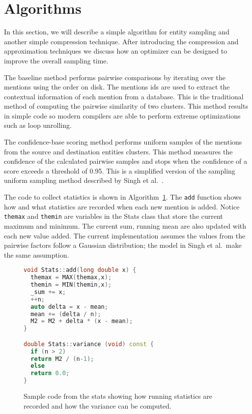 

\section{Algorithms}

In this section, we will describe a simple algorithm for entity sampling and
another simple compression technique.
After introducing the compression and approximation techniques we discuss how
an optimizer can be designed to improve the overall sampling time.

The baseline method performs pairwise comparisons by 
iterating over the mentions using the order on disk.
The mentions ids are used to extract the contextual information of each mention from a database.
This is the traditional method of computing the pairwise similarity of two clusters. 
This method results in simple code so modern compilers are able to perform extreme
optimizations such as loop unrolling.

The confidence-base scoring method performs uniform samples of the
mentions from the source and destination entities clusters. This method
measures the confidence of the calculated pairwise samples and stops when the
confidence of a score exceeds a threshold of 0.95.
This is a simplified version of the sampling uniform sampling method described by Singh et al.~\cite{singh2012monte}.

The code to collect statistics is shown in Algorithm~\ref{algo:stats}.
The \texttt{add} function shows how and what statistics are recorded when each new mention is added.
Notice \texttt{themax} and \texttt{themin} are variables in the Stats class that
store the current maximum and minimum.
The current sum, running mean are also updated with each new value added.
The current implementation assumes the values from the pairwise factors follow a Gaussian distribution;
the model in Singh et al.\ make the same assumption.

\begin{figure}
\centering
\begin{lstlisting}[language=c++,breaklines=true,keywordstyle=\color{blue},stringstyle=\color{red},commentstyle=\color{green}]
void Stats::add(long double x) {
  themax = MAX(themax,x);
  themin = MIN(themin,x);
  _sum += x;                   
  ++n;
  auto delta = x - mean;       
  mean += (delta / n);         
  M2 = M2 + delta * (x - mean);
} 

double Stats::variance (void) const {
  if (n > 2)  
  return M2 / (n-1);
  else
  return 0.0;
} 

\end{lstlisting}
\caption{Sample code from the stats showing how running statistics are recorded and how the variance can be computed.}
\label{algo:stats}
\end{figure}


